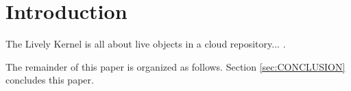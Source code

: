 
\section{Introduction}

The Lively Kernel is all about live objects in a cloud repository... \cite{Lincke2012LPC}.

The remainder of this paper is organized as follows. 
Section \ref{sec:CONCLUSION} concludes this paper.